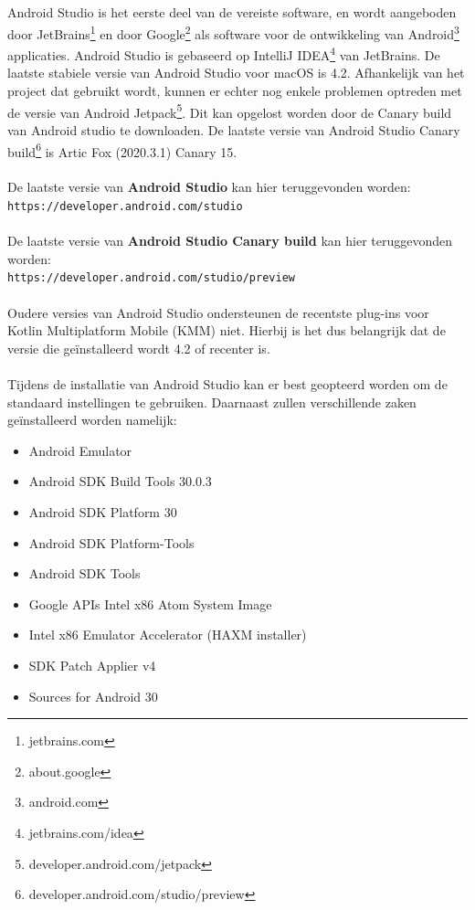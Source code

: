     \subsection{}
    \label{sec:I-AS}
    Android Studio is het eerste deel van de vereiste software, en wordt aangeboden door JetBrains\footnote{jetbrains.com} en door Google\footnote{about.google} als software voor de ontwikkeling van Android\footnote{android.com} applicaties. Android Studio is gebaseerd op IntelliJ IDEA\footnote{jetbrains.com/idea} van JetBrains. De laatste stabiele versie van Android Studio voor macOS is 4.2.  Afhankelijk van het project dat gebruikt wordt, kunnen er echter nog enkele problemen optreden met de versie van Android Jetpack\footnote{developer.android.com/jetpack}. Dit kan opgelost worden door de Canary build van Android studio te downloaden. De laatste versie van Android Studio Canary build\footnote{developer.android.com/studio/preview} is Artic Fox (2020.3.1) Canary 15.
    \\ \\
    De laatste versie van \textbf{Android Studio} kan hier teruggevonden worden:\\
    \verb*|https://developer.android.com/studio|
    \\ \\ 
    De laatste versie van \textbf{Android Studio Canary build} kan hier teruggevonden worden:\\
    \verb*|https://developer.android.com/studio/preview|
    \\ \\
    Oudere versies van Android Studio ondersteunen de recentste plug-ins voor Kotlin Multiplatform Mobile (KMM) niet. Hierbij is het dus belangrijk dat de versie die geïnstalleerd wordt 4.2 of recenter is.
    \\ \\ 
    Tijdens de installatie van Android Studio kan er best geopteerd worden om de standaard instellingen te gebruiken. Daarnaast zullen verschillende zaken geïnstalleerd worden namelijk:
    \begin{itemize}
        \item Android Emulator
        \item Android SDK Build Tools 30.0.3
        \item Android SDK Platform 30
        \item Android SDK Platform-Tools
        \item Android SDK Tools
        \item Google APIs Intel x86 Atom System Image
        \item Intel x86 Emulator Accelerator (HAXM installer)
        \item SDK Patch Applier v4
        \item Sources for Android 30
    \end{itemize}
